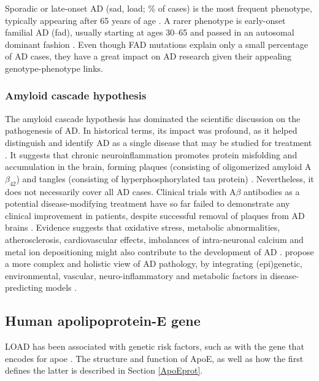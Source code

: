 \documentclass{amsart}
\begin{document}
Sporadic or late-onset AD (\acrshort{sad}, \acrshort{load}; \% of cases) is the most frequent phenotype, typically appearing after 65 years of age \cite{Beydoun2014EpidemiologicMeta-analysis}. A rarer phenotype is early-onset familial AD (\acrshort{fad}), usually starting at ages 30–65 and passed in an autosomal dominant fashion \cite{VanCauwenberghe2015ThePerspectives}.
Even though FAD mutations explain only a small percentage of AD cases, they have a great impact on AD research given their appealing genotype-phenotype links.

\subsubsection{Amyloid cascade hypothesis}
The amyloid cascade hypothesis has dominated the scientific discussion on the pathogenesis of AD. In historical terms, its impact was profound, as it helped distinguish and identify AD as a single disease that may be studied for treatment \cite{Hardy2006AlzheimersReappraisal}. It suggests that chronic neuroinflammation promotes protein misfolding and accumulation in the brain, forming plaques (consisting of oligomerized amyloid A$\beta_{42}$) and tangles (consisting of hyperphosphorylated tau protein) \cite{Edwards2019ANeurodegeneration}. Nevertheless, it does not necessarily cover all AD cases. Clinical trials with A$\beta$ antibodies as a potential disease-modifying treatment have so far failed to demonstrate any clinical improvement in patients, despite successful removal of plaques from AD brains \cite{Kepp2023TheReview,Kurkinen2023TheThinking}. Evidence suggests that oxidative stress, metabolic abnormalities, atherosclerosis, cardiovascular effects, imbalances of intra-neuronal calcium and metal ion depositioning might also contribute to the development of AD \cite{Kepp2023TheReview}. \citeauthor{Kepp2023TheReview} propose a more complex and holistic view of AD pathology, by integrating (epi)genetic, environmental, vascular, neuro-inflammatory and metabolic factors in disease-predicting models \cite{Kepp2023TheReview}.

\subsection{Human apolipoprotein-E gene}
LOAD has been associated with genetic risk factors, such as with the gene that encodes for \acrfull{apoe} \cite{Corder1993GeneFamilies}. The structure and function of ApoE, as well as how the first defines the latter is described in Section \ref{ApoEprot}.
\end{document}
